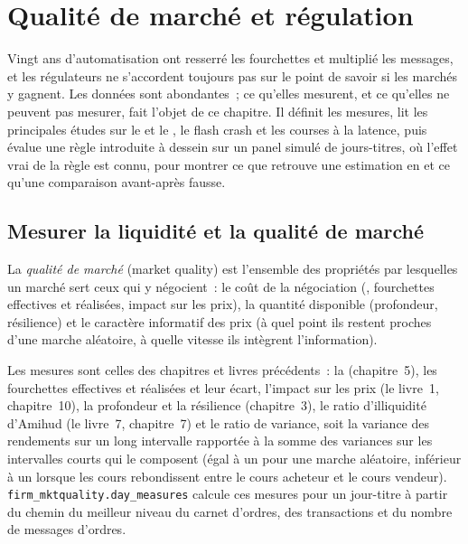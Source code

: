 \chapter{Qualité de marché et régulation}\label{ch:mx:market-quality-and-regulation}

Vingt ans d'automatisation ont resserré les fourchettes et multiplié les messages, et les régulateurs ne s'accordent toujours pas sur le point de savoir si les marchés y gagnent.
Les données sont abondantes~; ce qu'elles mesurent, et ce qu'elles ne peuvent pas mesurer, fait l'objet de ce chapitre. Il définit les mesures, lit les principales études sur
le  et le , le flash crash et les courses à la latence, puis évalue une règle introduite à dessein sur un panel simulé de jours-titres, où
l'effet vrai de la règle est connu, pour montrer ce que retrouve une estimation en  et ce qu'une comparaison avant-après fausse.

\section{Mesurer la liquidité et la qualité de marché}

\begin{definition}\label{def:mx:market-quality-and-regulation:quality}
La \emph{qualité de marché} (market quality) est l'ensemble des propriétés par lesquelles un marché sert ceux qui y négocient~: le coût de la négociation (,
fourchettes effectives et réalisées, impact sur les prix), la quantité disponible (profondeur, résilience) et le caractère informatif des prix (à quel point ils restent proches
d'une marche aléatoire, à quelle vitesse ils intègrent l'information).
\end{definition}

Les mesures sont celles des chapitres et livres précédents~: la  (chapitre~5), les fourchettes effectives et réalisées et leur écart,
l'impact sur les prix (le livre~1, chapitre~10), la profondeur et la résilience (chapitre~3), le ratio d'illiquidité d'Amihud (le livre~7, chapitre~7) et le ratio
de variance, soit la variance des rendements sur un long intervalle rapportée à la somme des variances sur les intervalles courts qui le composent (égal à un pour une marche aléatoire, inférieur à un
lorsque les cours rebondissent entre le cours acheteur et le cours vendeur). \texttt{firm\_mktquality.day\_measures} calcule ces mesures pour un jour-titre à partir du chemin du meilleur niveau du carnet d'ordres, des transactions et
du nombre de messages d'ordres.

